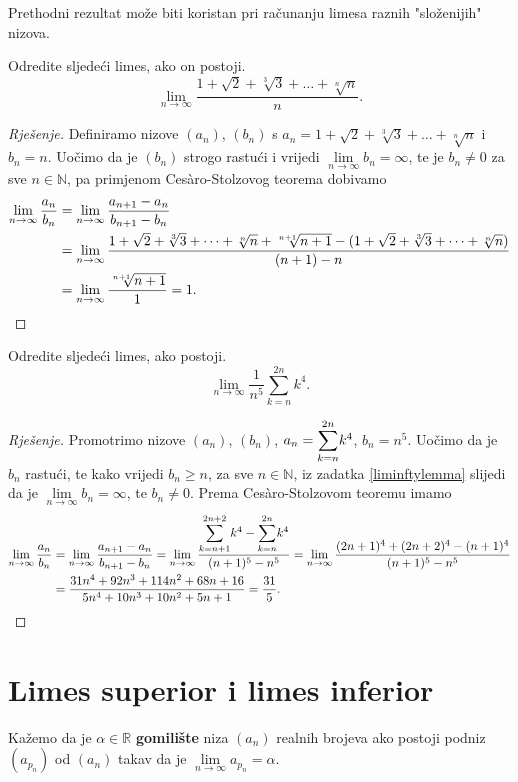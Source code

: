 Prethodni rezultat može biti koristan pri računanju limesa raznih "složenijih" nizova.
\begin{exercise}
Odredite sljedeći limes, ako on postoji. 
$$\lim\limits_{n\to \infty}{\dfrac{1+\sqrt{2}+\sqrt[3]{3}+\dots+\sqrt[n]{n}}{n}}.$$
\end{exercise}
\begin{proof}[Rješenje]
Definiramo nizove $(a_n)$, $(b_n)$ s $a_n=1+\sqrt{2}+\sqrt[3]{3}+\dots+\sqrt[n]{n}$ i $b_n=n$. Uočimo da je $(b_n)$ strogo rastući i vrijedi $\lim\limits_{n\to \infty}{b_n}=\infty$, te je $b_n\neq 0$ za sve $n\in \mathbb{N}$, pa primjenom Cesàro-Stolzovog teorema dobivamo
\begin{align*}
\lim\limits_{n\to \infty}{\dfrac{a_n}{b_n}}&=\lim\limits_{n\to \infty}{\dfrac{a_{n+1}-a_n}{b_{n+1}-b_n}}\\
&=\lim\limits_{n\to \infty}{\dfrac{1+\sqrt{2}+\sqrt[3]{3}+\dots+\sqrt[n]{n}+\sqrt[n+1]{n+1}-(1+\sqrt{2}+\sqrt[3]{3}+\dots+\sqrt[n]{n})}{(n+1)-n}}\\
&=\lim\limits_{n\to \infty}{\dfrac{\sqrt[n+1]{n+1}}{1}}=1.\qedhere
\end{align*}
\end{proof}
\begin{exercise}
Odredite sljedeći limes, ako postoji.
$$\lim\limits_{n\to \infty}{\dfrac{1}{n^5}\sum_{k=n}^{2n}{k^4}}.$$
\end{exercise}
\begin{proof}[Rješenje]
Promotrimo nizove $(a_n)$, $(b_n)$, $a_n=\dsum_{k=n}^{2n}{k^4}$, $b_n=n^5$. Uočimo da je $b_n$ rastući, te kako vrijedi $b_n\geq n$, za sve $n\in \mathbb{N}$, iz zadatka \ref{liminftylemma} slijedi da je $\lim\limits_{n\to \infty}{b_n}=\infty$, te $b_n\neq 0$. Prema Cesàro-Stolzovom teoremu imamo
\begin{align*}
\lim\limits_{n\to \infty}{\dfrac{a_n}{b_n}}&=\lim\limits_{n\to\infty}{\dfrac{a_{n+1}-a_n}{b_{n+1}-b_n}}
=\lim\limits_{n\to \infty}{\dfrac{\dsum_{k=n+1}^{2n+2}{k^4}-\dsum_{k=n}^{2n}{k^4}}{(n+1)^5-n^5}}=\lim\limits_{n\to \infty}{\dfrac{(2n+1)^4+(2n+2)^4-(n+1)^4}{(n+1)^5-n^5}}\\
&=\dfrac{31n^4+92n^3+114n^2+68n+16}{5n^4+10n^3+10n^2+5n+1}=\dfrac{31}{5}.\qedhere
\end{align*}
\end{proof}
\section{Limes superior i limes inferior}
\begin{definition}
Kažemo da je $\alpha\in \mathbb{R}$ \textbf{gomilište} niza $(a_n)$ realnih brojeva ako postoji podniz $(a_{p_n})$ od $(a_n)$ takav da je $\lim\limits_{n\to \infty}{a_{p_n}}=\alpha$.
\end{definition}

